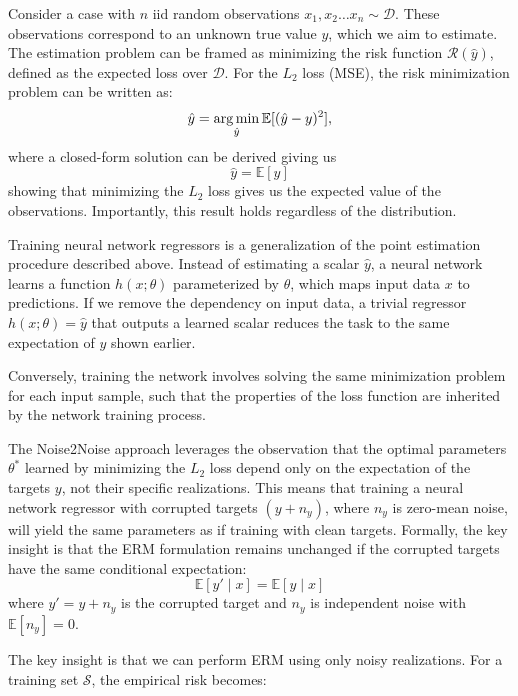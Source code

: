 Consider a case with $n$ \gls{iid} random observations $x_1, x_2 \dots x_n \sim \mathcal{D}$. These observations correspond to an unknown true value $y$, which we aim to estimate. The estimation problem can be framed as minimizing the risk function $\mathcal{R}(\hat{y})$, defined as the expected loss over $\mathcal{D}$. For the $L_2$ loss (\gls{MSE}), the risk minimization problem can be written as:
\begin{equation}
    \hat{y} = \operatorname*{arg\,min}_{\hat{y}} \mathbb{E}[(\hat{y} - y)^2],
\end{equation}
where a closed-form solution can be derived giving us
\begin{equation}
    \hat{y} = \mathbb{E}[y]
\end{equation}
showing that minimizing the $L_2$ loss gives us the expected value of the observations. Importantly, this result holds regardless of the distribution.

Training neural network regressors is a generalization of the point estimation procedure described above. Instead of estimating a scalar $\hat{y}$, a neural network learns a function $h(x; \theta)$ parameterized by $\theta$, which maps input data $x$ to predictions. If we remove the dependency on input data, a trivial regressor $h(x; \theta) = \hat{y}$ that outputs a learned scalar reduces the task to the same expectation of $y$ shown earlier.

Conversely, training the network involves solving the same minimization problem for each input sample, such that the properties of the loss function are inherited by the network training process.

The Noise2Noise approach leverages the observation that the optimal parameters $\theta^*$ learned by minimizing the $L_2$ loss depend only on the expectation of the targets $y$, not their specific realizations. This means that training a neural network regressor with corrupted targets $(y + n_y)$, where $n_y$ is zero-mean noise, will yield the same parameters as if training with clean targets. Formally, the key insight is that the ERM formulation remains unchanged if the corrupted targets have the same conditional expectation:
\begin{equation}
    \mathbb{E}[y{\prime} \mid x] = \mathbb{E}[y \mid x]
\end{equation}
where $y{\prime} = y + n_y$ is the corrupted target and $n_y$ is independent noise with $\mathbb{E}[n_y] = 0$.

The key insight is that we can perform \gls{ERM} using only noisy realizations. For a training set $\mathcal{S}$, the empirical risk becomes:


